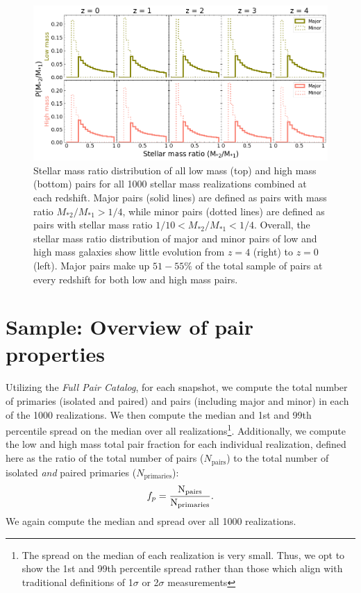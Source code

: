 \documentclass[twocolumn]{aastex631}
\newcommand{\ms}[1]{\ensuremath{M_{*{#1}}}}
\newcommand{\paircat}{\textit{Full Pair Catalog}}
\begin{document}
\begin{figure}[htb]
    \centering
    \includegraphics[width=\textwidth]{smrdist_1000.png}
    \caption{Stellar mass ratio distribution of all low mass (top) and high mass (bottom) pairs for all 1000 stellar mass realizations combined at each redshift. Major pairs (solid lines) are defined as pairs with mass ratio $\ms{2}/\ms{1} > 1/4$, while minor pairs (dotted lines) are defined as pairs with stellar mass ratio $1/10<\ms{2}/\ms{1}<1/4$. Overall, the stellar mass ratio distribution of major and minor pairs of low and high mass galaxies show little evolution from $z=4$ (right) to $z=0$ (left). 
    Major pairs make up $51-55\%$ of the total sample of pairs at every redshift for both low and high mass pairs.}
    \label{fig:massratio}
\end{figure}

\section{Sample: Overview of pair properties} \label{sec:pairprops}
    Utilizing the \paircat, for each snapshot, we compute the total number of primaries (isolated and paired) and pairs (including major and minor) in each of the 1000 realizations. We then compute the median and 1st and 99th percentile spread on the median over all realizations\footnote{The spread on the median of each realization is very small. Thus, we opt to show the 1st and 99th percentile spread rather than those which align with traditional definitions of 1$\sigma$ or 2$\sigma$ measurements}. 
    Additionally, we compute the low and high mass total pair fraction for each individual realization, defined here as the ratio of the total number of pairs ($N_{\mathrm{pairs}}$) to the total number of isolated \textit{and} paired primaries ($N_{\mathrm{primaries}}$):
    $$f_{p}=\rm \frac{N_{\mathrm{pairs}}}{N_{\mathrm{primaries}}}.$$
    We again compute the median and spread over all 1000 realizations.
    
\end{document}
